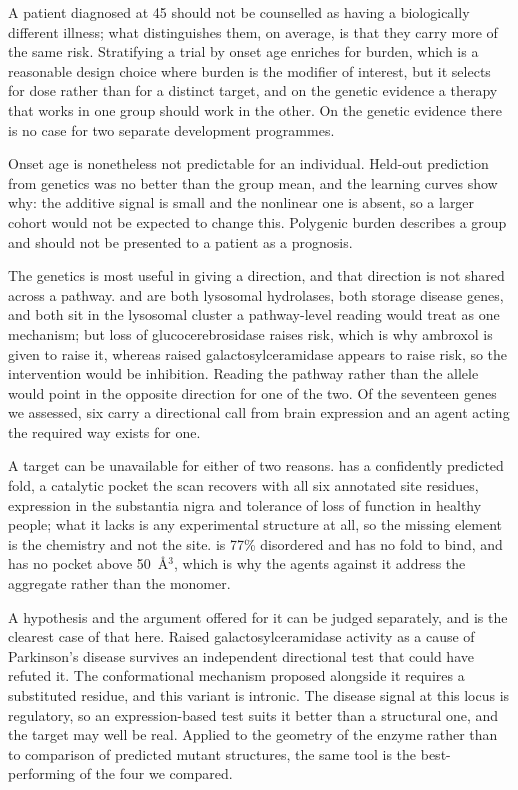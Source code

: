 \documentclass[10pt]{article}
\begin{document}
A patient diagnosed at 45 should not be counselled as having a biologically different illness; what distinguishes them, on average, is that they carry more of the same risk. Stratifying a trial by onset age enriches for burden, which is a reasonable design choice where burden is the modifier of interest, but it selects for dose rather than for a distinct target, and on the genetic evidence a therapy that works in one group should work in the other.
On the genetic evidence there is no case for two separate development programmes.

Onset age is nonetheless not predictable for an individual. Held-out prediction from genetics was
no better than the group mean, and the learning curves show why: the additive signal is small and
the nonlinear one is absent, so a larger cohort would not be expected to change this.
Polygenic burden describes a group and should not be presented to a patient as a prognosis.

The genetics is most useful in giving a direction, and that direction is not shared across a pathway.  and  are both
lysosomal hydrolases, both storage disease genes, and both sit in the lysosomal cluster a
pathway-level reading would treat as one mechanism; but loss of glucocerebrosidase raises risk,
which is why ambroxol is given to raise it, whereas raised galactosylceramidase appears to raise
risk, so the intervention would be inhibition. Reading the pathway rather than the allele would point in the opposite direction for one of the two. Of the seventeen genes we assessed, six carry a directional call
from brain expression and an agent acting the required way exists for one.

A target can be unavailable for either of two reasons.  has
a confidently predicted fold, a catalytic pocket the scan recovers with all six annotated site
residues, expression in the substantia nigra and tolerance of loss of function in healthy people;
what it lacks is any experimental structure at all, so the missing element is the chemistry and not the site.  is 77\% disordered and has no fold to bind, and  has no pocket above 50~\AA$^3$, which is why the agents against it address
the aggregate rather than the monomer.

A hypothesis and the argument offered for it can be judged separately, and  is the clearest case of that here. Raised galactosylceramidase activity as a cause of Parkinson's disease survives an independent directional test that could have refuted it. The conformational mechanism proposed alongside it requires a substituted residue, and this variant is intronic. The disease signal at this locus is regulatory, so an expression-based test suits it better than a structural one, and the target may well be real.
Applied to the geometry of the enzyme rather than to comparison of predicted mutant structures,
the same tool is the best-performing of the four we compared.
\end{document}
